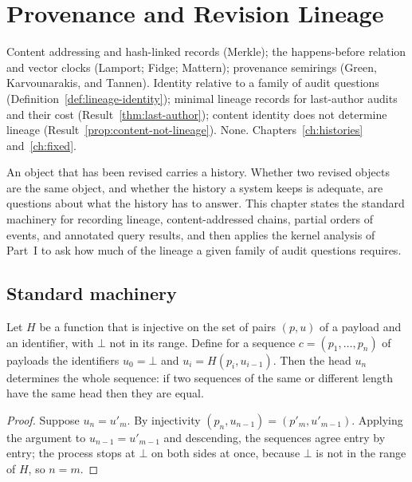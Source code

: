 \chapter{Provenance and Revision Lineage}\label{ch:provenance}
{Content addressing and hash-linked records (Merkle); the happens-before relation and vector clocks (Lamport; Fidge; Mattern); provenance semirings (Green, Karvounarakis, and Tannen).}
{Identity relative to a family of audit questions (Definition~\ref{def:lineage-identity}); minimal lineage records for last-author audits and their cost (Result~\ref{thm:last-author}); content identity does not determine lineage (Result~\ref{prop:content-not-lineage}).}
{None.}
{Chapters~\ref{ch:histories} and~\ref{ch:fixed}.}

An object that has been revised carries a history. Whether two revised objects are the same object, and whether the history a system keeps is adequate, are questions about what the history has to answer. This chapter states the standard machinery for recording lineage, content-addressed chains, partial orders of events, and annotated query results, and then applies the kernel analysis of Part~I to ask how much of the lineage a given family of audit questions requires.

\section{Standard machinery}

\begin{established}\label{prop:hash-chain}
Let $H$ be a function that is injective on the set of pairs $(p,u)$ of a payload and an identifier, with $\bot$ not in its range. Define for a sequence $c=(p_1,\dots,p_n)$ of payloads the identifiers $u_0=\bot$ and $u_i=H(p_i,u_{i-1})$. Then the head $u_n$ determines the whole sequence: if two sequences of the same or different length have the same head then they are equal.
\end{established}
\begin{proof}
Suppose $u_n=u'_m$. By injectivity $(p_n,u_{n-1})=(p'_m,u'_{m-1})$. Applying the argument to $u_{n-1}=u'_{m-1}$ and descending, the sequences agree entry by entry; the process stops at $\bot$ on both sides at once, because $\bot$ is not in the range of $H$, so $n=m$.
\end{proof}

